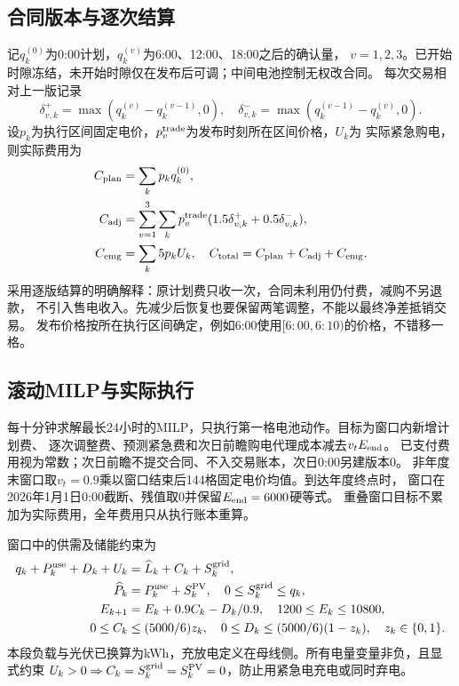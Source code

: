 \subsection{合同版本与逐次结算}
记$q_k^{(0)}$为0:00计划，$q_k^{(v)}$为6:00、12:00、18:00之后的确认量，
$v=1,2,3$。已开始时隙冻结，未开始时隙仅在发布后可调；中间电池控制无权改合同。
每次交易相对上一版记录
\begin{equation}
 \delta_{v,k}^+=\max(q_k^{(v)}-q_k^{(v-1)},0),\quad
 \delta_{v,k}^-=\max(q_k^{(v-1)}-q_k^{(v)},0).
\end{equation}
设$p_k$为执行区间固定电价，$p_v^{\rm trade}$为发布时刻所在区间价格，$U_k$为
实际紧急购电，则实际费用为
\begin{align}
 C_{\rm plan}&=\sum_kp_kq_k^{(0)},\\
 C_{\rm adj}&=\sum_{v=1}^3\sum_kp_v^{\rm trade}(1.5\delta_{v,k}^++0.5\delta_{v,k}^-),\\
 C_{\rm emg}&=\sum_k5p_kU_k,\quad
 C_{\rm total}=C_{\rm plan}+C_{\rm adj}+C_{\rm emg}.
\end{align}
采用逐版结算的明确解释：原计划费只收一次，合同未利用仍付费，减购不另退款，
不引入售电收入。先减少后恢复也要保留两笔调整，不能以最终净差抵销交易。
发布价格按所在执行区间确定，例如6:00使用$[6{:}00,6{:}10)$的价格，不错移一格。

\subsection{滚动MILP与实际执行}
每十分钟求解最长24小时的MILP，只执行第一格电池动作。目标为窗口内新增计划费、
逐次调整费、预测紧急费和次日前瞻购电代理成本减去$v_tE_{\rm end}$。
已支付费用视为常数；次日前瞻不提交合同、不入交易账本，次日0:00另建版本0。
非年度末窗口取$v_t=0.9$乘以窗口结束后144格固定电价均值。到达年度终点时，
窗口在2026年1月1日0:00截断、残值取0并保留$E_{\rm end}=6000$硬等式。
重叠窗口目标不累加为实际费用，全年费用只从执行账本重算。

窗口中的供需及储能约束为
\begin{align}
 q_k+P_k^{\rm use}+D_k+U_k&=\widehat L_k+C_k+S_k^{\rm grid},\\
 \widehat P_k&=P_k^{\rm use}+S_k^{\rm PV},\quad0\le S_k^{\rm grid}\le q_k,\\
 E_{k+1}&=E_k+0.9C_k-D_k/0.9,\quad1200\le E_k\le10800,\\
 0\le C_k&\le(5000/6)z_k,\quad0\le D_k\le(5000/6)(1-z_k),\quad z_k\in\{0,1\}.
\end{align}
本段负载与光伏已换算为kWh，充放电定义在母线侧。所有电量变量非负，且显式约束
$U_k>0\Rightarrow C_k=S_k^{\rm grid}=S_k^{\rm PV}=0$，防止用紧急电充电或同时弃电。


